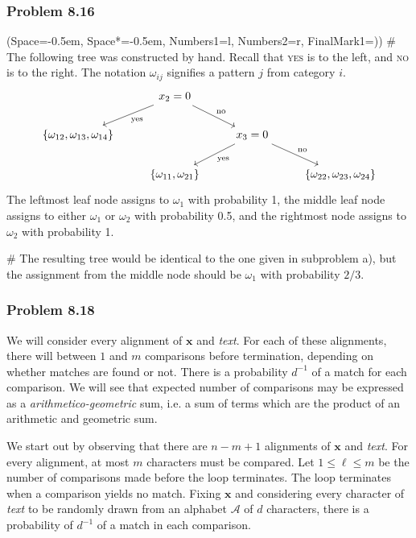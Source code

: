 \documentclass[12pt, a4paper]{article}
\newcommand{\listSpace}{-0.5em}%
\newcommand{\vect}[1]{\bm{#1}}
\begin{document}
{\subsubsection*{Problem 8.16}
\begin{easylist}[enumerate]
	\ListProperties(Space=\listSpace, Space*=\listSpace, Numbers1=l, Numbers2=r, FinalMark1={)})
	# The following tree was constructed by hand. Recall that \textsc{yes} is to the left, and \textsc{no} is to the right.
	The notation $\omega_{ij}$ signifies a pattern $j$ from category $i$.
	\begin{equation*}
	\begin{tikzcd}
	 & x_2 =0 \arrow{dr}{\text{no}} \arrow{dl}{\text{yes}} &  &  \\
	\{\omega_{12}, \omega_{13}, \omega_{14}\} &  & x_3 = 0 \arrow{dr}{\text{no}} \arrow{dl}{\text{yes}} &  \\
	 & \{\omega_{11}, \omega_{21}\} &  & \{\omega_{22}, \omega_{23}, \omega_{24}\} 
	\end{tikzcd}
	\end{equation*}
	The leftmost leaf node assigns to $\omega_1$ with probability 1, the middle leaf node assigns to either $\omega_1$ or $\omega_2$ with probability 0.5, and the rightmost node assigns to $\omega_2$ with probability 1.
	
	# The resulting tree would be identical to the one given in subproblem a), but the assignment from the middle node should be $\omega_1$ with probability $2/3$.
	
\end{easylist}



\subsubsection*{Problem 8.18}
We will consider every alignment of $\vect{x}$ and \emph{text}.
For each of these alignments, there will between $1$ and $m$ comparisons before termination, depending on whether matches are found or not.
There is a probability $d^{-1}$ of a match for each comparison.
We will see that expected number of comparisons may be expressed as a \emph{arithmetico-geometric} sum, i.e. a sum of terms which are the product of an arithmetic and geometric sum.

We start out by observing that there are $n - m + 1$ alignments of $\vect{x}$ and \emph{text}.
For every alignment, at most $m$ characters must be compared.
Let $1 \leq  \ell \leq m$ be the number of comparisons made before the loop terminates.
The loop terminates when a comparison yields no match.
Fixing $\vect{x}$ and considering every character of \emph{text} to be randomly drawn from an alphabet $\mathcal{A}$ of $d$ characters, there is a probability of $d^{-1}$ of a match in each comparison.

}
\end{document}
